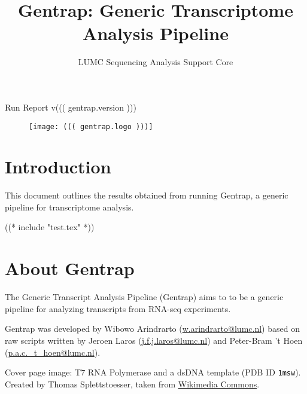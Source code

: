\documentclass[a4paper,12pt]{article}
\begin{document}
\setlength{\parindent}{0in}
\title{\Huge Gentrap: Generic Transcriptome Analysis Pipeline}
\author{LUMC Sequencing Analysis Support Core}
\maketitle
\begin{center}
    {\LARGE Run Report v((( gentrap.version )))}
\end{center}
\begin{figure}[h!]
    \centering
    \texttt{[image: ((( gentrap.logo )))]}
\end{figure}
\thispagestyle{empty}
\clearpage

\tableofcontents
\clearpage


\section{Introduction}
\label{sec:intro}

This document outlines the results obtained from running Gentrap, a generic
pipeline for transcriptome analysis.


((* include "test.tex" *))



\section{About Gentrap}
\label{apx:about}

The Generic Transcript Analysis Pipeline (Gentrap) aims to to be a
generic pipeline for analyzing transcripts from RNA-seq experiments.

Gentrap was developed by Wibowo Arindrarto (\href{mailto:w.arindrarto@lumc.nl}{w.arindrarto@lumc.nl})
based on raw scripts written by Jeroen Laros
(\href{mailto:j.f.j.laros@lumc.nl}{j.f.j.laros@lumc.nl}) and
Peter-Bram 't Hoen
(\href{mailto:p.a.c._t_hoen@lumc.nl}{p.a.c._t_hoen@lumc.nl}).

\indent

Cover page image: T7 RNA Polymerase and a dsDNA template (PDB ID \texttt{1msw}).
Created by Thomas Splettstoesser, taken from
\href{http://commons.wikimedia.org/wiki/File:T7_RNA_polymerase.jpg}{Wikimedia Commons}.
\end{document}
